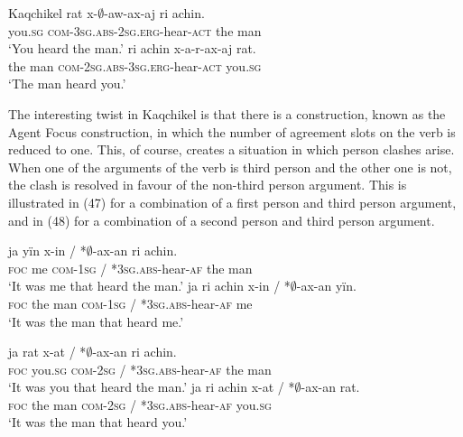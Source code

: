 \documentclass[output=paper]{langsci/langscibook}
\begin{document}
\ea Kaqchikel
\ea 
 \gll rat  x-$\emptyset$-aw-ax-aj             ri   achin.    \\
      you.\textsc{sg} \textsc{com}{}-\textsc{3sg.abs-2sg.erg}{}-hear-\textsc{act} the man\\
 \glt ‘You heard the man.’
\ex \gll       ri achin  x-a-r-ax-aj              rat.\\
         the man \textsc{com-2sg.abs-3sg.erg}{}-hear-\textsc{act} you.\textsc{sg}\\
\glt ‘The man heard you.’
\z
\z

The interesting twist in Kaqchikel is that there is a construction, known as the Agent Focus construction, in which the number of agreement slots on the verb is reduced to one. This, of course, creates a situation in which person clashes arise. When one of the arguments of the verb is third person and the other one is not, the clash is resolved in favour of the non-third person argument. This is illustrated in (47) for a combination of a first person and third person argument, and in (48) for a combination of a second person and third person argument.

\ea \label{bkm:Ref454183795}  
\ea \gll   ja    yïn x-in / *$\emptyset$-ax-an              ri   achin.\\
    \textsc{foc} me \textsc{com-1sg} / \textsc{*3sg.abs}{}-hear-\textsc{af} the man\\
\glt    ‘It was me that heard the man.’
\ex
\gll  ja    ri    achin x-in / *$\emptyset$-ax-an                      yïn.\\
    \textsc{foc} the man  \textsc{com-1sg} / \textsc{*3sg.abs}{}-hear-\textsc{af} me\\
\glt    ‘It was the man that heard me.’
\z
\z

\ea \label{bkm:Ref454183994} 
\ea \gll  ja     rat x-at / *$\emptyset$-ax-an          ri   achin.\\
    \textsc{foc} you.\textsc{sg} \textsc{com-2sg} / \textsc{*3sg.abs}{}-hear-\textsc{af} the man\\
\glt    ‘It was you that heard the man.’
\ex
\gll ja    ri    achin x-at / *$\emptyset$-ax-an                        rat.\\
    \textsc{foc} the man   \textsc{com}{}-\textsc{2sg} / \textsc{*3sg.abs}{}-hear-\textsc{af} you.\textsc{sg}\\
\glt    ‘It was the man that heard you.’
\z
\z
\end{document}
